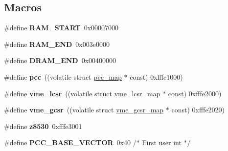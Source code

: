\subsection*{Macros}
\begin{DoxyCompactItemize}
\item 
\mbox{\label{group__RTEMSBSPsM68kMVME147s_ga2fb476d2a94e0e54f1125306010164a1}} 
\#define {\bfseries R\+A\+M\+\_\+\+S\+T\+A\+RT}~0x00007000
\item 
\mbox{\label{group__RTEMSBSPsM68kMVME147s_gacedc86555cbe508b02ba7cae729e64b1}} 
\#define {\bfseries R\+A\+M\+\_\+\+E\+ND}~0x003e0000
\item 
\mbox{\label{group__RTEMSBSPsM68kMVME147s_ga003428986ba50f638eb65cf48f57b7ac}} 
\#define {\bfseries D\+R\+A\+M\+\_\+\+E\+ND}~0x00400000
\item 
\mbox{\label{group__RTEMSBSPsM68kMVME147s_ga3f138e106a6d4d521a6fbb37b6ba013c}} 
\#define {\bfseries pcc}~((volatile struct \mbox{\hyperlink{structpcc__map}{pcc\+\_\+map}} $\ast$ const) 0xfffe1000)
\item 
\mbox{\label{group__RTEMSBSPsM68kMVME147s_gab3097f15aa9b46dcdda2bfc09154bc90}} 
\#define {\bfseries vme\+\_\+lcsr}~((volatile struct \mbox{\hyperlink{structvme__lcsr__map}{vme\+\_\+lcsr\+\_\+map}} $\ast$ const) 0xfffe2000)
\item 
\mbox{\label{group__RTEMSBSPsM68kMVME147s_gac459fe35a250970a580716505ddbf648}} 
\#define {\bfseries vme\+\_\+gcsr}~((volatile struct \mbox{\hyperlink{structvme__gcsr__map}{vme\+\_\+gcsr\+\_\+map}} $\ast$ const) 0xfffe2020)
\item 
\mbox{\label{group__RTEMSBSPsM68kMVME147s_gaa1d0aaa85bb1046417ad718b3a1966c7}} 
\#define {\bfseries z8530}~0xfffe3001
\item 
\mbox{\label{group__RTEMSBSPsM68kMVME147s_gaab2935dd943605d855d1fd8a5d67a0bf}} 
\#define {\bfseries P\+C\+C\+\_\+\+B\+A\+S\+E\+\_\+\+V\+E\+C\+T\+OR}~0x40 /$\ast$ First user int $\ast$/
\item 

\end{DoxyCompactItemize}
